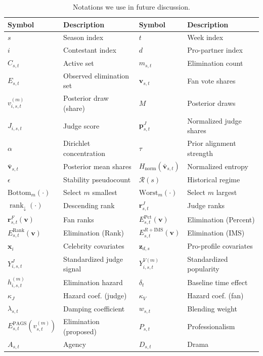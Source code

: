 \begin{table}[t]
\centering
\caption{Notations we use in future discussion.}
\label{tab:notations}
\small
\setlength{\tabcolsep}{4.2pt}
\renewcommand{\arraystretch}{1.05}
\begin{tabular}{ll|ll}
\toprule
\textbf{Symbol} & \textbf{Description} & \textbf{Symbol} & \textbf{Description} \\
\midrule
$s$ & Season index & $t$ & Week index \\
$i$ & Contestant index & $d$ & Pro-partner index \\
$C_{s,t}$ & Active set & $m_{s,t}$ & Elimination count \\
$E_{s,t}$ & Observed elimination set & $\mathbf v_{s,t}$ & Fan vote shares \\
$v^{(m)}_{i,s,t}$ & Posterior draw (share) & $M$ & Posterior draws \\
$J_{i,s,t}$ & Judge score & $\mathbf p^{J}_{s,t}$ & Normalized judge shares \\
$\alpha$ & Dirichlet concentration & $\tau$ & Prior alignment strength \\
$\bar{\mathbf v}_{s,t}$ & Posterior mean shares & $H_{\mathrm{norm}}(\bar{\mathbf v}_{s,t})$ & Normalized entropy \\
$\epsilon$ & Stability pseudocount & $\mathcal{R}(s)$ & Historical regime \\
$\mathrm{Bottom}_{m}(\cdot)$ & Select $m$ smallest & $\mathrm{Worst}_{m}(\cdot)$ & Select $m$ largest \\
$\operatorname{rank}_{\downarrow}(\cdot)$ & Descending rank & $\mathbf r^{J}_{s,t}$ & Judge ranks \\
$\mathbf r^{F}_{s,t}(\mathbf v)$ & Fan ranks & $E^{\mathrm{Pct}}_{s,t}(\mathbf v)$ & Elimination (Percent) \\
$E^{\mathrm{Rank}}_{s,t}(\mathbf v)$ & Elimination (Rank) & $E^{R+\mathrm{IMS}}_{s,t}(\mathbf v)$ & Elimination (IMS) \\
$\mathbf x_i$ & Celebrity covariates & $\mathbf z_{d,s}$ & Pro-profile covariates \\
$Y^{J}_{i,s,t}$ & Standardized judge signal & $Y^{V(m)}_{i,s,t}$ & Standardized popularity \\
$h^{(m)}_{i,s,t}$ & Elimination hazard & $\delta_t$ & Baseline time effect \\
$\kappa_J$ & Hazard coef. (judge) & $\kappa_V$ & Hazard coef. (fan) \\
$\lambda_{s,t}$ & Damping coefficient & $w_{s,t}$ & Blending weight \\
$E^{\mathrm{PAGS}}_{s,t}(v^{(m)}_{s,t})$ & Elimination (proposed) & $P_{s,t}$ & Professionalism \\
$A_{s,t}$ & Agency & $D_{s,t}$ & Drama \\
\bottomrule
\end{tabular}
\end{table}
